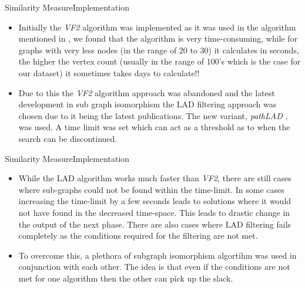 \documentclass{beamer}
\begin{document}
\begin{frame}{Similarity Measure}{Implementation}
    \begin{itemize}
        \item Initially the \textit{VF2} algorithm was implemented as it was used in the algorithm mentioned in \cite{Liu:2006:GDS:1150402.1150522}, we found that the algorithm is very time-consuming, while for graphs with very less nodes (in the range of 20 to 30) it calculates in seconds, the higher the vertex count (usually in the range of 100's which is the case for our dataset) it sometimes takes days to calculate!!
        
        \item  Due to this the \textit{VF2} algorithm approach was abandoned and the latest development in sub graph isomorphism the LAD filtering approach was chosen due to it being the latest publications. The new variant, \textit{pathLAD} \cite{pathLAD}, was used. A time limit was set which can act as a threshold as to when the search can be discontinued.
    \end{itemize}
\end{frame}  

\begin{frame}{Similarity Measure}{Implementation}
    \begin{itemize}
        \item While the LAD algorithm works much faster than \textit{VF2}, there are still cases where sub-graphs could not be found within the time-limit. In some cases increasing the time-limit by a few seconds leads to solutions where it would not have found in the decreased time-space. This leads to drastic change in the output of the next phase. There are also cases where LAD filtering fails completely as the conditions required for the filtering are not met.
        
        \item  To overcome this, a plethora of subgraph isomorphism algortihm was used in conjunction with each other. The idea is that even if the conditions are not met for one algorithm then the other can pick up the slack.
    \end{itemize}
\end{frame}
\end{document}
